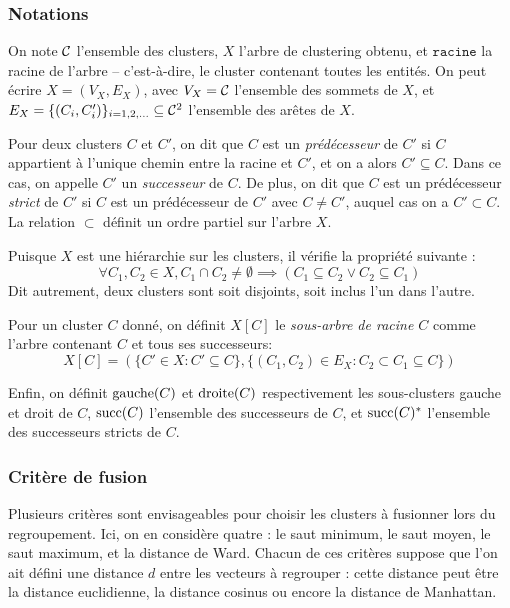 \subsubsection{Notations}

On note $\mathcal{C}$ l'ensemble des clusters, $X$ l'arbre de clustering obtenu, et $\texttt{racine}$ la racine de l'arbre – c'est-à-dire, le cluster contenant toutes les entités. On peut écrire $X = (V_X, E_X)$, avec $V_X = \mathcal{C}$ l'ensemble des sommets de $X$, et $E_X = \{(C_i, C_i')\}_{i = 1, 2, \ldots } \subseteq \mathcal{C}^2$ l'ensemble des arêtes de $X$.

Pour deux clusters $C$ et $C'$, on dit que $C$ est un \textit{prédécesseur} de $C'$ si $C$ appartient à l'unique chemin entre la racine et $C'$, et on a alors $C' \subseteq C$. Dans ce cas, on appelle $C'$ un \textit{successeur} de $C$. De plus, on dit que $C$ est un prédécesseur \textit{strict} de $C'$ si $C$ est un prédécesseur de $C'$ avec $C \neq C'$, auquel cas on a $C' \subset C$. La relation $\subset$ définit un ordre partiel sur l'arbre $X$.

Puisque $X$ est une hiérarchie sur les clusters, il vérifie la propriété suivante :
\begin{equation}
    \forall C_1, C_2 \in X, C_1 \cap C_2 \neq \emptyset \implies (C_1 \subseteq C_2 \lor C_2 \subseteq C_1)
\end{equation}
Dit autrement, deux clusters sont soit disjoints, soit inclus l'un dans l'autre.

Pour un cluster $C$ donné, on définit $X[C]$ le \textit{sous-arbre de racine $C$} comme l'arbre contenant $C$ et tous ses successeurs:
\begin{equation}
    X[C] = (\{C' \in X : C' \subseteq C\}, \{(C_1, C_2) \in E_X : C_2 \subset C_1 \subseteq C\})
\end{equation}

Enfin, on définit $\operatorname{gauche}(C)$ et $\operatorname{droite}(C)$ respectivement les sous-clusters gauche et droit de $C$, $\operatorname{succ}(C)$ l'ensemble des successeurs de $C$, et $\operatorname{succ}(C)^*$ l'ensemble des successeurs stricts de $C$.

\subsubsection{Critère de fusion}
\label{sec:te-clustering-linkage}

Plusieurs critères sont envisageables pour choisir les clusters à fusionner lors du regroupement. Ici, on en considère quatre : le saut minimum, le saut moyen, le saut maximum, et la distance de Ward. Chacun de ces critères suppose que l'on ait défini une distance $d$ entre les vecteurs à regrouper : cette distance peut être la distance euclidienne, la distance cosinus ou encore la distance de Manhattan. 


